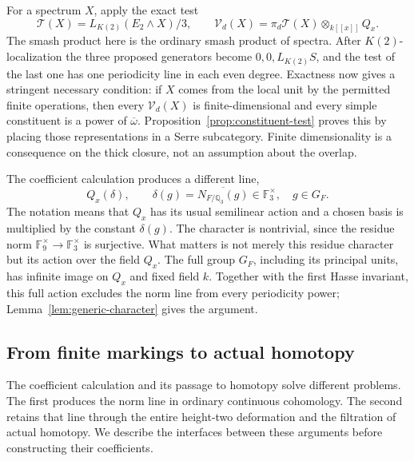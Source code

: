For a spectrum \(X\), apply the exact test
\[
 \mathcal T(X)=L_{K(2)}(E_2\wedge X)/3,
 \qquad
 \mathcal V_d(X)=\pi_d\mathcal T(X)\otimes_{k[[x]]}Q_x.
\]
The smash product here is the ordinary smash product of spectra.
After \(K(2)\)-localization the three proposed generators become
\(0,0,L_{K(2)}S\), and the test of the last one has one periodicity line
in each even degree. Exactness now gives a stringent necessary condition:
if \(X\) comes from the local unit by the permitted finite operations, then
every \(\mathcal V_d(X)\) is finite-dimensional and every simple
constituent is a power of \(\overline\omega\).
Proposition~\ref{prop:constituent-test} proves this by placing those
representations in a Serre subcategory. Finite dimensionality is a
consequence on the thick closure, not an assumption about the overlap.

The coefficient calculation produces a different line,
\begin{equation}\label{eq:intro-norm-line}
 Q_x(\delta),\qquad
 \delta(g)=\overline{N_{F/\mathbb Q_3}(g)}
       \in\mathbb F_3^\times,\quad g\in G_F.
\end{equation}
The notation means that \(Q_x\) has its usual semilinear action and a chosen
basis is multiplied by the constant \(\delta(g)\). The character is
nontrivial, since the residue norm
\(\mathbb F_9^\times\to\mathbb F_3^\times\) is surjective. What matters is
not merely this residue character but its action over the field \(Q_x\).
The full group \(G_F\), including its principal units, has infinite image
on \(Q_x\) and fixed field \(k\). Together with the first Hasse invariant,
this full action excludes the norm line from every periodicity power;
Lemma~\ref{lem:generic-character} gives the argument.

\subsection{From finite markings to actual homotopy}

The coefficient calculation and its passage to homotopy solve different
problems. The first produces the norm line in ordinary continuous
cohomology. The second retains that line through the entire height-two
deformation and the filtration of actual homotopy. We describe the
interfaces between these arguments before constructing their coefficients.

